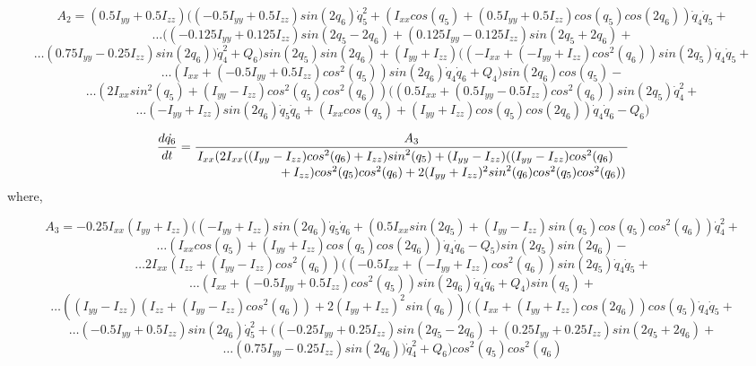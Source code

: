 \documentclass[12pt, letterpaper]{article}
\begin{document}
\[A_{2} =(0.5 I_{yy} + 0.5 I_{zz}) ((- 0.5 I_{yy} + 0.5 I_{zz}) {sin}(2 q_{6}) \dot{q}_{5}^{2} + (I_{xx} {cos}(q_{5}) + (0.5 I_{yy} + 0.5 I_{zz}) {cos}(q_{5}) {cos}(2 q_{6})) \dot{q}_{4} \dot{q}_{5} +
\]
\[
\ldots((- 0.125 I_{yy} + 0.125 I_{zz}) {sin}(2 q_{5} - 2 q_{6}) + (0.125 I_{yy} - 0.125 I_{zz}) {sin}(2 q_{5} + 2 q_{6}) +
\]
\[
\ldots(0.75 I_{yy} - 0.25 I_{zz}) {sin}(2 q_{6})) \dot{q}_{4}^{2} + Q_{6}) {sin}(2 q_{5}) {sin}(2 q_{6}) + (I_{yy} + I_{zz}) ((- I_{xx} + (- I_{yy} + I_{zz}) {cos}^{2}(q_{6})) {sin}(2 q_{5}) \dot{q}_{4} \dot{q}_{5} +
\]
\[
\ldots(I_{xx} + (- 0.5 I_{yy} + 0.5 I_{zz}) {cos}^{2}(q_{5})) {sin}(2 q_{6}) \dot{q}_{4} \dot{q}_{6} + Q_{4}) {sin}(2 q_{6}) {cos}(q_{5}) -
\]
\[
\ldots(2 I_{xx} {sin}^{2}(q_{5}) + (I_{yy} - I_{zz}) {cos}^{2}(q_{5}) {cos}^{2}(q_{6})) ((0.5 I_{xx} + (0.5 I_{yy} - 0.5 I_{zz}) {cos}^{2}(q_{6})) {sin}(2 q_{5}) \dot{q}_{4}^{2} +
\]
\[
\ldots(- I_{yy} + I_{zz}) {sin}(2 q_{6}) \dot{q}_{5} \dot{q}_{6} + (I_{xx} {cos}(q_{5}) + (I_{yy} + I_{zz}) {cos}(q_{5}) {cos}(2 q_{6})) \dot{q}_{4} \dot{q}_{6} - Q_{6})
\]

\[
\frac{d\dot{q_{6}}}{dt} =
\frac{A_{3}}
{\splitfrac{I_{xx}( 2 I_{xx} ((I_{yy}-I_{zz}) {cos}^{2}(q_{6}) + I_{zz}) {sin}^{2}(q_{5}) + 
(I_{yy} - I_{zz}) ((I_{yy}-I_{zz}) {cos}^{2}(q_{6})}
{ + I_{zz}) {cos}^{2}(q_{5}) {cos}^{2}(q_{6}) + 2 (I_{yy} + I_{zz})^{2} {sin}^{2}(q_{6}) {cos}^{2}(q_{5}) {cos}^{2}(q_{6}))}}
\]
where,

\[
A_{3} = - 0.25 I_{xx} (I_{yy} + I_{zz})((- I_{yy} + I_{zz}){sin}(2 q_{6}) \dot{q}_{5} \dot{q}_{6} + (0.5 I_{xx} {sin}(2 q_{5}) + (I_{yy} - I_{zz}) {sin}(q_{5}) {cos}(q_{5}) {cos}^{2}(q_{6})) \dot{q}_{4}^{2}+
\]
\[
\ldots(I_{xx} {cos}(q_{5}) + (I_{yy} + I_{zz}) {cos}(q_{5}) {cos}(2 q_{6})) \dot{q}_{4} \dot{q}_{6} - Q_{5}) {sin}(2 q_{5}) {sin}(2 q_{6}) - 
\]
\[
\ldots2 I_{xx} (I_{zz} + (I_{yy} - I_{zz}) {cos}^{2}(q_{6})) ((- 0.5 I_{xx} + (- I_{yy} + I_{zz}) {cos}^{2}(q_{6})) {sin}(2 q_{5}) \dot{q}_{4} \dot{q}_{5} +
\]
\[
\ldots(I_{xx} + (- 0.5 I_{yy} + 0.5 I_{zz}) {cos}^{2}(q_{5})) {sin}(2 q_{6}) \dot{q}_{4} \dot{q}_{6} + Q_{4}) {sin}(q_{5}) +
\]
\[
\ldots((I_{yy} - I_{zz}) (I_{zz} + (I_{yy} - I_{zz}) {cos}^{2}(q_{6})) + 2 (I_{yy} + I_{zz})^{2} {sin}(q_{6})) ((I_{xx} + (I_{yy} + I_{zz}) {cos}(2 q_{6})) {cos}(q_{5}) \dot{q}_{4} \dot{q}_{5} +
\]
\[
\ldots(- 0.5 I_{yy} + 0.5 I_{zz}) {sin}(2 q_{6}) \dot{q}_{5}^{2} + ((- 0.25 I_{yy} + 0.25 I_{zz}) {sin}(2 q_{5} - 2 q_{6}) + (0.25 I_{yy} + 0.25 I_{zz}) {sin}(2 q_{5} + 2 q_{6}) +
\]
\[
\ldots(0.75 I_{yy} - 0.25 I_{zz}) {sin}(2 q_{6})) \dot{q}_{4}^{2} + Q_{6}) {cos}^{2}(q_{5}) {cos}^{2}(q_{6}) 
\]
\end{document}
